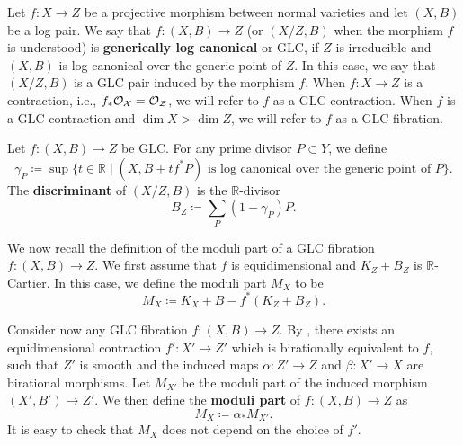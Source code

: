 \documentclass[12pt]{amsart}
\theoremstyle{plain}
\theoremstyle{definition}
\def\dim{\operatorname{dim}}
\newcommand{\margg}[1]{\normalsize{{\color{red}\footnote{{\color{red}#1}}}{\marginpar[{\color{red}\hfill\tiny\thefootnote$\rightarrow$}]{{\color{red}$\leftarrow$\tiny\thefootnote}}}}}
\newcommand{\Ste}[1]{\margg{(Ste) #1}}
\begin{document}
Let $f\colon X \rightarrow Z$ be a projective morphism between normal varieties
and let $(X, B)$ be a log pair.
We say that $f\colon (X, B) \rightarrow Z$ (or $(X/Z, B)$ when the morphism $f$ is understood)
is {\bf generically log canonical} or GLC, if $Z$ is irreducible and $(X, B)$ is log canonical over the generic point 
of $Z$.
In this case, we say that $(X/Z,B)$ is a GLC pair induced by the morphism $f$.
When $f\colon X\rightarrow Z$ is a contraction, i.e., $f_*\cal O_X= \cal O_Z$, we will refer to $f$ 
as a GLC contraction.
When $f$ is a GLC contraction and $\dim X > \dim Z$, we will refer to $f$ as a GLC fibration.

Let $f\colon (X, B) \rightarrow Z$ be GLC. For any prime divisor $P\subset Y$, we define
\[
\gamma_P \coloneqq \sup\{t\in \mathbb R\mid (X,B+tf^*P) \text{ is log canonical over the generic point of }P\}.
\]
The {\bf discriminant } of $(X/Z,B)$ is the $\mathbb R$-divisor
\[
B_Z \coloneqq \sum_P (1-\gamma_P)P.
\]


We now recall the definition of the moduli part of a GLC fibration  $f\colon (X, B) \rightarrow Z$.
We first assume  that $f$ is equidimensional and
$K_Z+B_Z$ is $\mathbb R$-Cartier.
In this case, we define the moduli part $M_X$ to be
\[
M_X\coloneqq K_X+B-f^*(K_Z+B_Z).
\]

Consider now any GLC fibration $f\colon (X, B) \to Z$. By \cite[Theorem 2.1]{AK00}, 
there exists an equidimensional contraction $f'\colon X'\to Z'$ which is birationally equivalent to $f$, 
such that $Z'$ is smooth and the induced maps $\alpha\colon Z'\to Z$ and $\beta\colon X'\to X$ 
are birational morphisms.
Let $M_{X'}$ be the moduli part of the induced morphism $(X',B') \rightarrow Z'$. 
We then define the {\bf moduli part} of $f\colon (X, B) \rightarrow Z$  as
\[M_X\coloneqq\alpha_*M_{X'}.
\]
It is easy to check that $M_X$ does not depend on the choice of $f'$.
\end{document}
